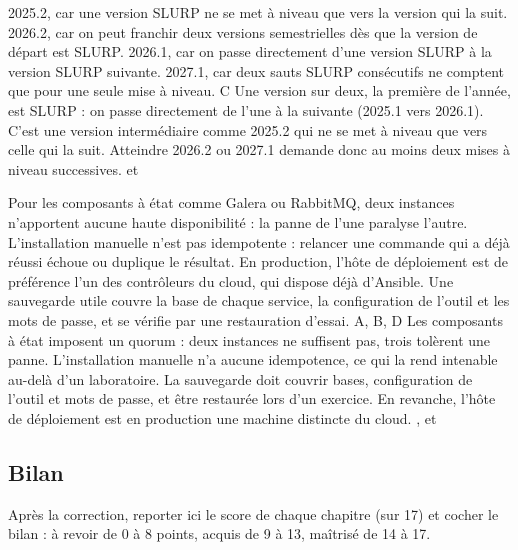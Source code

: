   {2025.2, car une version SLURP ne se met à niveau que vers la version qui la suit.}
  {2026.2, car on peut franchir deux versions semestrielles dès que la version de départ est SLURP.}
  {2026.1, car on passe directement d'une version SLURP à la version SLURP suivante.}
  {2027.1, car deux sauts SLURP consécutifs ne comptent que pour une seule mise à niveau.}
  {C}
  {Une version sur deux, la première de l'année, est SLURP : on passe directement de l'une à la suivante (2025.1 vers 2026.1). C'est une version intermédiaire comme 2025.2 qui ne se met à niveau que vers celle qui la suit. Atteindre 2026.2 ou 2027.1 demande donc au moins deux mises à niveau successives.}
  { et }

  {Pour les composants à état comme Galera ou RabbitMQ, deux instances n'apportent aucune haute disponibilité : la panne de l'une paralyse l'autre.}
  {L'installation manuelle n'est pas idempotente : relancer une commande qui a déjà réussi échoue ou duplique le résultat.}
  {En production, l'hôte de déploiement est de préférence l'un des contrôleurs du cloud, qui dispose déjà d'Ansible.}
  {Une sauvegarde utile couvre la base de chaque service, la configuration de l'outil et les mots de passe, et se vérifie par une restauration d'essai.}
  {A, B, D}
  {Les composants à état imposent un quorum : deux instances ne suffisent pas, trois tolèrent une panne. L'installation manuelle n'a aucune idempotence, ce qui la rend intenable au-delà d'un laboratoire. La sauvegarde doit couvrir bases, configuration de l'outil et mots de passe, et être restaurée lors d'un exercice. En revanche, l'hôte de déploiement est en production une machine distincte du cloud.}
  {,  et }

\clearpage
{}
\subsection*{Bilan}
Après la correction, reporter ici le score de chaque chapitre (sur 17) et cocher le bilan : à revoir de 0 à 8 points, acquis de 9 à 13,
maîtrisé de 14 à 17.\label{qcm:finq}

